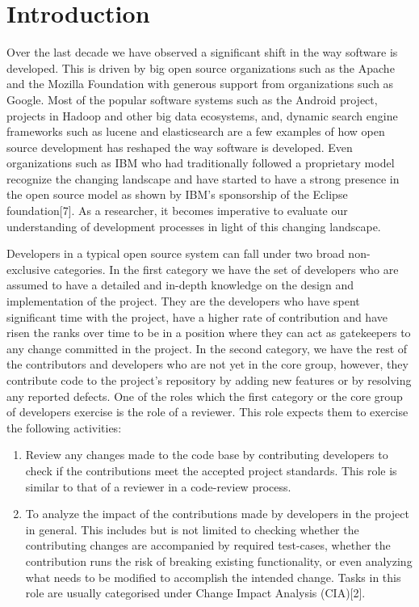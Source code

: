 
\section{Introduction}
\label{sec:intro}

Over the last decade we have observed a significant shift in the way software is developed. This is driven by big open source organizations such as the Apache and the Mozilla Foundation with generous support from organizations such as Google. Most of the popular software systems such as the Android project, projects in Hadoop and other big data ecosystems, and, dynamic search engine frameworks such as lucene and elasticsearch are a few examples of how open source development has reshaped the way software is developed. Even organizations such as IBM who had traditionally followed a proprietary model recognize the changing landscape and have started to have a strong presence in the open source model as shown by IBM's sponsorship of the Eclipse foundation[7]. As a researcher, it becomes imperative to evaluate our understanding of development processes in light of this changing landscape.

Developers in a typical open source system can fall under two broad non-exclusive categories. In the first category we have the set of developers who are assumed to have a detailed and in-depth knowledge on the design and implementation of the project. They are the developers who have spent significant time with the project, have a higher rate of contribution and have risen the ranks over time to be in a position where they can act as gatekeepers to any change committed in the project. In the second category, we have the rest of the contributors and developers who are not yet in the core group, however, they contribute code to the project's repository by adding new features or by resolving any reported defects. One of the roles which the first category or the core group of developers exercise is the role of a reviewer. This role expects them to exercise the following activities:\\
\begin{enumerate}
\item Review any changes made to the code base by contributing developers to check if the contributions meet the accepted project standards. This role is similar to that of a reviewer in a code-review process.
\item To analyze the impact of the contributions made by developers in the project in general. This includes but is not limited to checking whether the contributing changes are accompanied by required test-cases, whether the contribution runs the risk of breaking existing functionality, or even analyzing what needs to be modified to accomplish the intended change. Tasks in this role are usually categorised under Change Impact Analysis (CIA)[2].
\end{enumerate}

